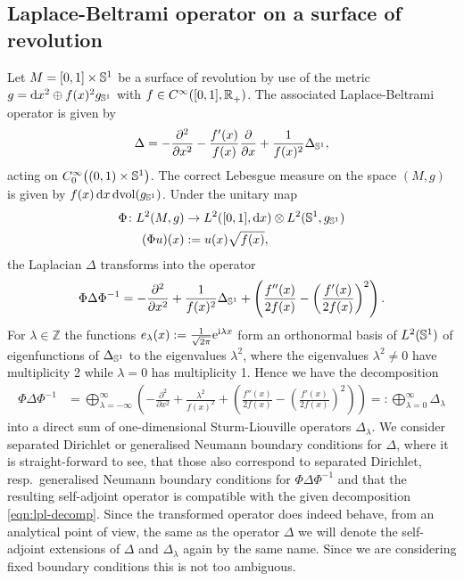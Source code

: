 \subsection{Laplace-Beltrami operator on a surface of revolution}
\label{sec:laplace-beltrami}
Let $M = [0,1]\times\Sphere{1}$ be a surface of revolution by use of the metric
$g = \mathrm dx^2 \oplus f(x)^2 g_\Sphere{1}$ with $f\in \Cinf([0,1],
\Rplus)$. The associated Laplace-Beltrami operator is given by
\begin{align}
  \Delta = -\frac{\partial^2}{\partial x^2} -
            \frac{f'(x)}{f(x)}\frac{\partial}{\partial x} +
            \frac{1}{f(x)^2}\Delta_\Sphere1,
  \label{eqn:laplace}
\end{align}
acting on $\Cinf[0]\bigl((0,1)\times\Sphere1\bigr)$. The correct Lebesgue
measure on the space $(M,g)$ is given by $f(x)\,\mathrm dx\, \mathrm
d\!\vol(g_\Sphere1)$. Under the unitary map
\begin{align*}
  \Phi\colon L^2(M, g)&\to L^2([0,1], \mathrm dx)\otimes L^2(\Sphere1,
  g_\Sphere1) \\ (\Phi u)(x) &:= u(x) \sqrt{f(x)},
\end{align*}
the Laplacian $\Delta$ transforms into the operator
\begin{align*}
  \Phi\Delta\Phi^{-1} = -\frac{\partial^2}{\partial x^2} +
  \frac{1}{f(x)^2}\Delta_\Sphere1 + \left( \frac{f''(x)}{2f(x)} -
  \left(\frac{f'(x)}{2f(x)}\right)^2\right).
\end{align*}
For $\lambda\in\mathbb{Z}$ the functions $e_\lambda(x) :=
\frac{1}{\sqrt{2\pi}}\Eto{\mathrm i\lambda x}$ form an orthonormal basis of
$L^2(\Sphere1)$ of eigenfunctions of $\Delta_\Sphere1$ to the eigenvalues
$\lambda^2$, where the eigenvalues $\lambda^2 \neq 0$ have multiplicity 2 while
$\lambda = 0$ has multiplicity 1. Hence we have the decomposition
\begin{align}
  \label{eqn:lpl-decomp}
  \Phi\Delta\Phi^{-1} &= \bigoplus_{\lambda=-\infty}^{\infty} \left(
    -\frac{\partial^2}{\partial x^2} + \frac{\lambda^2}{f(x)^2} + 
     \left( \frac{f''(x)}{2f(x)} -
     \left(\frac{f'(x)}{2f(x)}\right)^2\right)\right)
     =: \bigoplus_{\lambda=0}^{\infty}\Delta_\lambda
\end{align}
into a direct sum of one-dimensional Sturm-Liouville operators $\Delta_\lambda$.
We consider separated Dirichlet or generalised Neumann boundary conditions for
$\Delta$, where it is straight-forward to see, that those also correspond to
separated Dirichlet, resp.\ generalised Neumann boundary conditions for
$\Phi\Delta\Phi^{-1}$ and that the resulting self-adjoint operator is compatible
with the given decomposition \eqref{eqn:lpl-decomp}. Since the transformed
operator does indeed behave, from an analytical point of view, the same as the
operator $\Delta$ we will denote the self-adjoint extensions of $\Delta$ and
$\Delta_\lambda$ again by the same name. Since we are considering fixed boundary
conditions this is not too ambiguous.

